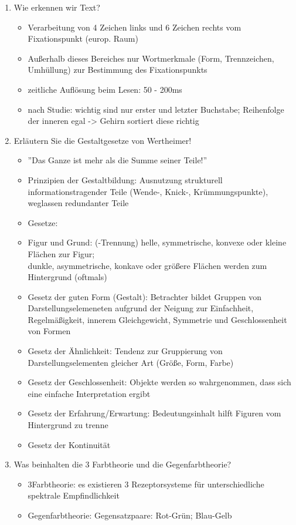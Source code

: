 \begin{enumerate}
	\item Wie erkennen wir Text?
	\begin{itemize}
		\item Verarbeitung von 4 Zeichen links und 6 Zeichen rechts vom Fixationspunkt (europ. Raum)
		\item Außerhalb dieses Bereiches nur Wortmerkmale (Form, Trennzeichen, Umhüllung) zur Bestimmung des Fixationspunkts
		\item zeitliche Auflösung beim Lesen: 50 - 200ms
		\item nach Studie: wichtig sind nur erster und letzter Buchstabe; Reihenfolge der inneren egal -> Gehirn sortiert diese richtig
	\end{itemize}


	\item Erläutern Sie die Gestaltgesetze von Wertheimer!
	\begin{itemize}
		\item ''Das Ganze ist mehr als die Summe seiner Teile!''
		\item Prinzipien der Gestaltbildung: Ausnutzung strukturell informationstragender Teile (Wende-, Knick-, Krümmungspunkte), weglassen redundanter Teile
		\item Gesetze: 
		\item Figur und Grund: (-Trennung) helle, symmetrische, konvexe oder kleine Flächen zur Figur;\\
		dunkle, asymmetrische, konkave oder größere Flächen werden zum Hintergrund (oftmals)
		\item Gesetz der guten Form (Gestalt): Betrachter bildet Gruppen von Darstellungselemeneten aufgrund der Neigung zur Einfachheit, Regelmäßigkeit, innerem Gleichgewicht, Symmetrie und Geschlossenheit von Formen
		\item Gesetz der Ähnlichkeit: Tendenz zur Gruppierung von Darstellungselementen gleicher Art (Größe, Form, Farbe)
		\item Gesetz der Geschlossenheit: Objekte werden so wahrgenommen, dass sich eine einfache Interpretation ergibt
		\item Gesetz der Erfahrung/Erwartung: Bedeutungsinhalt hilft Figuren vom Hintergrund zu trenne
		\item Gesetz der Kontinuität
	\end{itemize}
	\item Was beinhalten die 3 Farbtheorie und die Gegenfarbtheorie?
	\begin{itemize}
		\item 3Farbtheorie: es existieren 3 Rezeptorsysteme für unterschiedliche spektrale Empfindlichkeit
		\item Gegenfarbtheorie: Gegensatzpaare: Rot-Grün; Blau-Gelb
	\end{itemize}
	

\end{enumerate}

